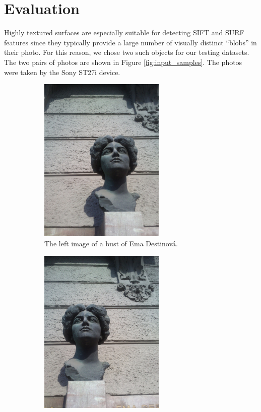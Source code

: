 \chapter{Evaluation}
\label{chap:eval}

Highly textured surfaces are especially suitable for detecting SIFT and SURF features since they typically provide a large number of visually distinct ``blobs'' in their photo. 
For this reason, we chose two such objects for our testing datasets. 
The two pairs of photos are shown in Figure \ref{fig:input_samples}. 
The photos were taken by the Sony ST27i device.

\begin{figure}[H]
\centering

\begin{subfigure}[b]{0.45\textwidth}
\centering
\includegraphics[width=6.0cm]{img/ema_a.png}
\caption{The left image of a bust of Ema Destinová.} \label{0}
\end{subfigure}
\begin{subfigure}[b]{0.45\textwidth}
\centering
\includegraphics[width=6.0cm]{img/ema_b.png}

\end{subfigure}
\end{figure}
